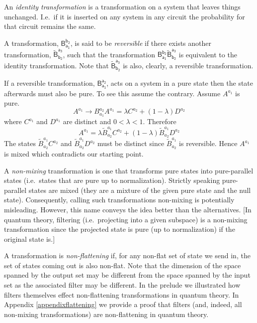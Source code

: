 \documentclass[10pt]{article}
\begin{document}
An \emph{identity transformation} is a transformation on a system that leaves things unchanged. I.e.\ if it is inserted on any system in any circuit the probability for that circuit remains the same.

A transformation, $\mathsf{B_{a_1}^{b_2}}$, is said to be \emph{reversible} if there exists another transformation, $\mathsf{\tilde B^{a_3}_{b_2}}$, such that the transformation $\mathsf{B_{a_1}^{b_2}}\mathsf{\tilde B^{a_3}_{b_2}}$ is equivalent to the identity transformation.  Note that $\mathsf{\tilde B^{a_3}_{b_2}}$ is also, clearly, a reversible transformation.

If a reversible transformation, $\mathsf{B_{a_1}^{a_2}}$,  acts on a system in a pure state then the state afterwards must also be pure.  To see this assume the contrary. Assume $A^{a_1}$ is pure.
\begin{equation}
A^{a_1} \longrightarrow B_{a_1}^{a_2} A^{a_1} = \lambda C^{a_2} + (1-\lambda) D^{a_2}
\end{equation}
where $C^{a_1}$ and $D^{a_1}$ are distinct and $0<\lambda<1$.
Therefore
\begin{equation}
 A^{a_1} = \lambda\tilde B^{a_1}_{a_2} C^{a_2} + (1-\lambda)\tilde B^{a_1}_{a_2} D^{a_2}
\end{equation}
The states $ \tilde B^{a_1}_{a_2} C^{a_2}$ and $\tilde B^{a_1}_{a_2} D^{a_2}$ must be distinct since $\tilde B^{a_1}_{a_2}$ is reversible.  Hence $A^{a_1}$ is mixed which contradicts our starting point.

A \emph{non-mixing} transformation is one that transforms pure states into pure-parallel states (i.e.\ states that are pure up to normalization).  Strictly speaking pure-parallel states are mixed (they are a mixture of the given pure state and the null state).  Consequently, calling such transformations non-mixing is potentially misleading. However, this name conveys the idea better than the alternatives.  [In quantum theory, filtering (i.e.\ projecting into a given subspace) is a non-mixing transformation since the projected state is pure (up to normalization) if the original state is.]

A transformation is \emph{non-flattening} if, for any non-flat set of state we send in, the set of states coming out is also non-flat.  Note that the dimension of the space spanned by the output set may be different from the space spanned by the input set as the associated filter may be different.
In the prelude we illustrated how filters themselves effect non-flattening transformations in quantum theory.  In Appendix \ref{appendixflattening} we provide a proof that filters (and, indeed, all non-mixing transformations) are non-flattening in quantum theory.
\end{document}
